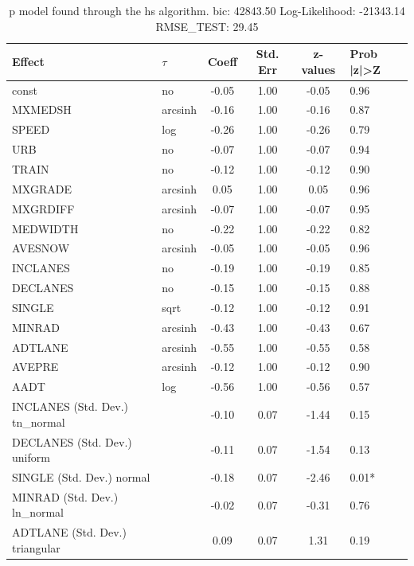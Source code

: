 \begin{table}
	\caption{p model found through the hs algorithm. bic: 42843.50 Log-Likelihood: -21343.14 RMSE_TEST: 29.45}
	\begin{center}
		\begin{tabular}{|l|l|c|c|c|l|}
			\hline
			Effect & $\tau$ & Coeff & Std. Err & z-values & Prob |z|>Z \\
			\hline
			const & no & -0.05 & 1.00 & -0.05 & 0.96 \\
			\hline
			MXMEDSH & arcsinh & -0.16 & 1.00 & -0.16 & 0.87 \\
			\hline
			SPEED & log & -0.26 & 1.00 & -0.26 & 0.79 \\
			\hline
			URB & no & -0.07 & 1.00 & -0.07 & 0.94 \\
			\hline
			TRAIN & no & -0.12 & 1.00 & -0.12 & 0.90 \\
			\hline
			MXGRADE & arcsinh & 0.05 & 1.00 & 0.05 & 0.96 \\
			\hline
			MXGRDIFF & arcsinh & -0.07 & 1.00 & -0.07 & 0.95 \\
			\hline
			MEDWIDTH & no & -0.22 & 1.00 & -0.22 & 0.82 \\
			\hline
			AVESNOW & arcsinh & -0.05 & 1.00 & -0.05 & 0.96 \\
			\hline
			INCLANES & no & -0.19 & 1.00 & -0.19 & 0.85 \\
			\hline
			DECLANES & no & -0.15 & 1.00 & -0.15 & 0.88 \\
			\hline
			SINGLE & sqrt & -0.12 & 1.00 & -0.12 & 0.91 \\
			\hline
			MINRAD & arcsinh & -0.43 & 1.00 & -0.43 & 0.67 \\
			\hline
			ADTLANE & arcsinh & -0.55 & 1.00 & -0.55 & 0.58 \\
			\hline
			AVEPRE & arcsinh & -0.12 & 1.00 & -0.12 & 0.90 \\
			\hline
			AADT & log & -0.56 & 1.00 & -0.56 & 0.57 \\
			\hline
			INCLANES (Std. Dev.) tn_normal &  & -0.10 & 0.07 & -1.44 & 0.15 \\
			\hline
			DECLANES (Std. Dev.) uniform &  & -0.11 & 0.07 & -1.54 & 0.13 \\
			\hline
			SINGLE (Std. Dev.) normal &  & -0.18 & 0.07 & -2.46 & 0.01* \\
			\hline
			MINRAD (Std. Dev.) ln_normal &  & -0.02 & 0.07 & -0.31 & 0.76 \\
			\hline
			ADTLANE (Std. Dev.) triangular &  & 0.09 & 0.07 & 1.31 & 0.19 \\

\end{tabular}
\end{center}
\end{table}
